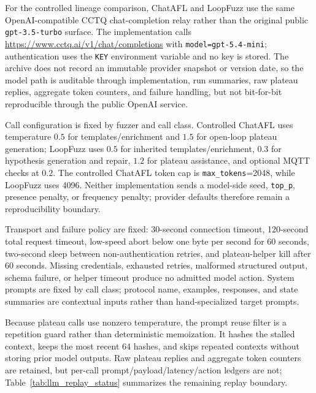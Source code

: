 \documentclass[final,5p,times,number]{elsarticle}
\begin{document}
For the controlled lineage comparison, ChatAFL and LoopFuzz use the same OpenAI-compatible CCTQ chat-completion relay rather than the original public \texttt{gpt-3.5-turbo} surface. The implementation calls \url{https://www.cctq.ai/v1/chat/completions} with \texttt{model=gpt-5.4-mini}; authentication uses the \texttt{KEY} environment variable and no key is stored. The archive does not record an immutable provider snapshot or version date, so the model path is auditable through implementation, run summaries, raw plateau replies, aggregate token counters, and failure handling, but not bit-for-bit reproducible through the public OpenAI service.

Call configuration is fixed by fuzzer and call class. Controlled ChatAFL uses temperature $0.5$ for templates/enrichment and $1.5$ for open-loop plateau generation; LoopFuzz uses $0.5$ for inherited templates/enrichment, $0.3$ for hypothesis generation and repair, $1.2$ for plateau assistance, and optional MQTT checks at $0.2$. The controlled ChatAFL token cap is \texttt{max\_tokens}=2048, while LoopFuzz uses 4096. Neither implementation sends a model-side seed, \texttt{top\_p}, presence penalty, or frequency penalty; provider defaults therefore remain a reproducibility boundary.

Transport and failure policy are fixed: 30-second connection timeout, 120-second total request timeout, low-speed abort below one byte per second for 60 seconds, two-second sleep between non-authentication retries, and plateau-helper kill after 60 seconds. Missing credentials, exhausted retries, malformed structured output, schema failure, or helper timeout produce no admitted model action. System prompts are fixed by call class; protocol name, examples, responses, and state summaries are contextual inputs rather than hand-specialized target prompts.

Because plateau calls use nonzero temperature, the prompt reuse filter is a repetition guard rather than deterministic memoization. It hashes the stalled context, keeps the most recent 64 hashes, and skips repeated contexts without storing prior model outputs. Raw plateau replies and aggregate token counters are retained, but per-call prompt/payload/latency/action ledgers are not; Table~\ref{tab:llm_replay_status} summarizes the remaining replay boundary.
\end{document}
